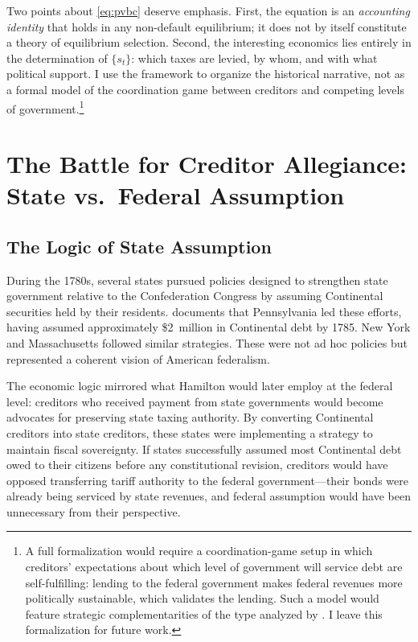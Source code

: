 \documentclass[12pt]{article}
\begin{document}
Two points about \eqref{eq:pvbc} deserve emphasis. First, the equation
is an \emph{accounting identity} that holds in any non-default
equilibrium; it does not by itself constitute a theory of equilibrium
selection. Second, the interesting economics lies entirely in the
determination of $\{s_t\}$: which taxes are levied, by whom, and with
what political support. I use the framework to organize the historical
narrative, not as a formal model of the coordination game between
creditors and competing levels of government.\footnote{A full
formalization would require a coordination-game setup in which creditors'
expectations about which level of government will service debt are
self-fulfilling: lending to the federal government makes federal revenues
more politically sustainable, which validates the lending. Such a model
would feature strategic complementarities of the type analyzed by
\citet{CooperJohn1988}. I leave this formalization for future work.}


\section{The Battle for Creditor Allegiance: State vs.\ Federal
Assumption}
\label{sec:battle}

\subsection{The Logic of State Assumption}

During the 1780s, several states pursued policies designed to strengthen
state government relative to the Confederation Congress by assuming
Continental securities held by their residents. \citet[pp.~237--239]{Ferguson1961}
documents that Pennsylvania led these efforts, having assumed
approximately \$2~million in Continental debt by 1785. New York and
Massachusetts followed similar strategies. These were not ad hoc
policies but represented a coherent vision of American federalism.

The economic logic mirrored what Hamilton would later employ at the
federal level: creditors who received payment from state governments
would become advocates for preserving state taxing authority. By
converting Continental creditors into state creditors, these states were
implementing a strategy to maintain fiscal sovereignty. If states
successfully assumed most Continental debt owed to their citizens before
any constitutional revision, creditors would have opposed transferring
tariff authority to the federal government---their bonds were already
being serviced by state revenues, and federal assumption would have been
unnecessary from their perspective.
\end{document}

